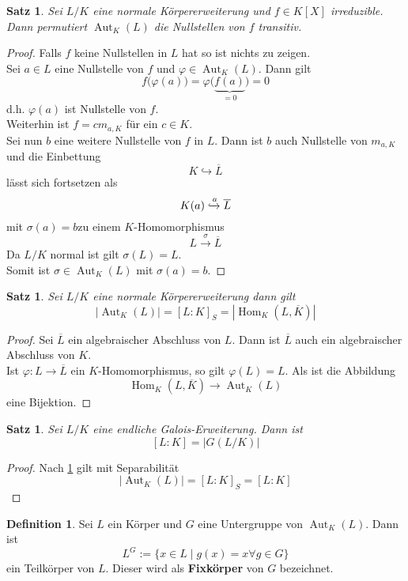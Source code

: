 \documentclass[10pt,a4paper]{article}
\newcommand{\ol}[1]{\overline{#1}}
\newcommand{\abs}[1]{\left|#1\right|}
\newcommand{\Hom}{\operatorname{Hom}}
\newcommand{\Aut}{\operatorname{Aut}}
\theoremstyle{plain}
\newtheorem{satz}[theorem]{Satz}
\theoremstyle{definition}
\newtheorem{definition}[theorem]{Definition}
\theoremstyle{remark}
\begin{document}

	\begin{satz}
		Sei $L/K$ eine normale Körpererweiterung und $f\in K[X]$ irreduzible. Dann permutiert $\Aut_K(L)$ die Nullstellen von $f$ transitiv.
	\end{satz}
	\begin{proof}
		Falls $f$ keine Nullstellen in $L$ hat so ist nichts zu zeigen.\\
		Sei $a\in L$ eine Nullstelle von $f$ und $\varphi\in\Aut_K(L)$. Dann gilt
		\[f\big(\varphi(a)\big)=\varphi\big(\underbrace{f(a)}_{=0}\big)=0\]
		d.h. $\varphi(a)$ ist Nullstelle von $f$.\\
		Weiterhin ist $f=cm_{a,K}$ für ein $c\in K$.\\
		Sei nun $b$ eine weitere Nullstelle von $f$ in $L$. Dann ist $b$ auch Nullstelle von $m_{a,K}$ und die Einbettung
		\[K\hookrightarrow \ol L\]
		lässt sich fortsetzen als
		\[K(a)\xhookrightarrow{a} \ol L\]
		mit $\sigma(a)=b$zu einem $K$-Homomorphismus
		\[L\xrightarrow{\sigma}\ol L\]
		Da $L/K$ normal ist gilt $\sigma(L)=L$.\\
		Somit ist $\sigma\in\Aut_K(L)$ mit $\sigma(a)=b$.
	\end{proof}

	\begin{satz}\label{satz:SepGradAut}
		Sei $L/K$ eine normale Körpererweiterung dann gilt\[\abs{\Aut_K(L)}=[L:K]_S=\abs{\Hom_K(L,\ol K)}\]
	\end{satz}
	\begin{proof}
		Sei $\ol L$ ein algebraischer Abschluss von $L$. Dann ist $\ol L$ auch ein algebraischer Abschluss von $K$.\\
		Ist $\varphi:L\to\ol L$ ein $K$-Homomorphismus, so gilt $\varphi(L)=L$. Als ist die Abbildung
		\[\Hom_K(L,\ol K)\to\Aut_K(L)\]
		eine Bijektion.
	\end{proof}
	
	\begin{satz}
		Sei $L/K$ eine endliche Galois-Erweiterung. Dann ist
		\[[L:K]=\abs{G(L/K)}\]
	\end{satz}
	\begin{proof}
		Nach \ref{satz:SepGradAut} gilt mit Separabilität
		\[\abs{\Aut_K(L)}=[L:K]_S=[L:K]\]
	\end{proof}

	\begin{definition}
		Sei $L$ ein Körper und $G$ eine Untergruppe von $\Aut_K(L)$. Dann ist
		\[L^G:=\{x\in L\mid g(x)=x\forall g\in G\}\]
		ein Teilkörper von $L$. Dieser wird als \textbf{Fixkörper} von $G$ bezeichnet.
	\end{definition}
\end{document}
